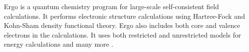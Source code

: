 Ergo is a quantum chemistry program for large-scale self-consistent field calculations. It performs electronic structure calculations using Hartree-Fock and Kohn-Sham density functional theory. Ergo also includes both core and valence electrons in the calculations. It uses both restricted and unrestricted models for energy calculations and many more \cite{Rudberg_2011}.